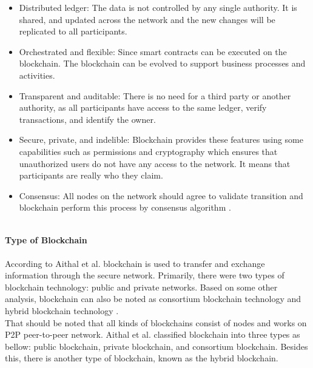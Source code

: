 \begin{itemize}
    \item Distributed ledger: The data is not controlled by any single authority. It is shared, and updated across the network and the new changes will be replicated to all participants.
    \item Orchestrated and flexible: Since smart contracts can be executed on the blockchain. The blockchain can be evolved to support business processes and activities.
    \item Transparent and auditable: There is no need for a third party or another authority, as all participants have access to the same ledger, verify transactions, and identify the owner. 
    \item Secure, private, and indelible:
    Blockchain provides these features using some capabilities such as permissions and cryptography which ensures that  
    unauthorized users do not have any access to the network. It means that participants are really who they claim.
    \item Consensus: All nodes on the network should agree to validate transition and blockchain perform this process by consensus algorithm \cite{Gupta}.
\end{itemize}
\\
\textbf{Type of Blockchain} \\
\\
According to Aithal et al. \cite{Aithal} blockchain is used to transfer and exchange information through the secure network. Primarily, there were two types of blockchain technology: public and private networks. Based on some other analysis, blockchain can also be noted as consortium blockchain technology and hybrid blockchain technology \cite{Aithal}. \\
That should be noted that all kinds of blockchains consist of nodes and works on P2P peer-to-peer network. Aithal et al. \cite{Aithal} classified blockchain into three types as bellow: public blockchain, private blockchain, and consortium blockchain. Besides this, there is another type of blockchain, known as the hybrid blockchain.
